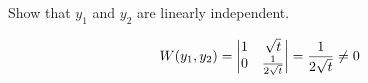 Show that $y_1$ and $y_2$ are linearly independent.

\begin{align*}
    W(y_1, y_2) = \detx{1}{\sqrt{t}}{0}{\over{2\sqrt{t}}} = \over{2\sqrt{t}} \neq 0
\end{align*}